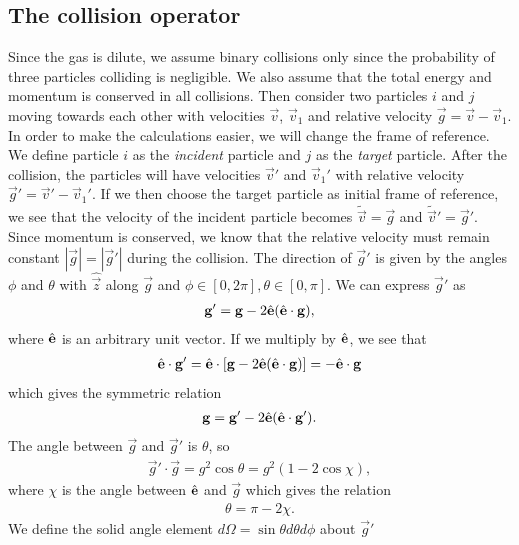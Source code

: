 \subsection{The collision operator}
Since the gas is dilute, we assume binary collisions only since the probability of three particles colliding is negligible. We also assume that the total energy and momentum is conserved in all collisions. Then consider two particles $i$ and $j$ moving towards each other with velocities $\vec v$, $\vec v_1$ and relative velocity $\vec g = \vec v - \vec v_1$. In order to make the calculations easier, we will change the frame of reference. We define particle $i$ as the \textit{incident} particle and $j$ as the \textit{target} particle. After the collision, the particles will have velocities $\vec v'$ and $\vec v_1'$ with relative velocity $\vec g' = \vec v' - \vec v_1'$. If we then choose the target particle as initial frame of reference, we see that the velocity of the incident particle becomes $\tilde {\vec v} = \vec g$ and $\tilde {\vec v}' = \vec g'$. Since momentum is conserved, we know that the relative velocity must remain constant $|\vec g| = |\vec g'|$ during the collision. The direction of $\vec g'$ is given by the angles $\phi$ and $\theta$ with $\hat {\vec z}$ along $\vec g$ and $\phi \in [0, 2\pi], \theta \in [0, \pi]$. We can express $\vec g'$ as
\begin{align}
	\mathbf g' = \mathbf g - 2\hat {\mathbf{e}}(\hat {\mathbf{e}}\cdot\mathbf g),
\end{align}
where $\hat {\mathbf{e}}$ is an arbitrary unit vector. If we multiply by $\hat {\mathbf{e}}$, we see that 
\begin{align}
	\hat {\mathbf{e}}\cdot \mathbf g' = \hat {\mathbf{e}}\cdot\left[\mathbf g - 2\hat {\mathbf{e}}(\hat {\mathbf{e}}\cdot\mathbf g)\right] = -\hat {\mathbf{e}} \cdot \mathbf g
\end{align}
which gives the symmetric relation
\begin{align}
	\mathbf g = \mathbf g' - 2\hat {\mathbf{e}}(\hat {\mathbf{e}}\cdot\mathbf g').
\end{align}
The angle between $\vec g$ and $\vec g'$ is $\theta$, so
\begin{align}
	\vec g'\cdot \vec g = g^2\cos\theta = g^2(1 - 2\cos \chi),
\end{align}
where $\chi$ is the angle between $\hat {\mathbf{e}}$ and $\vec g$ which gives the relation
\begin{align}
	\theta = \pi - 2\chi.
\end{align}
We define the solid angle element $d\Omega=\sin\theta d\theta d\phi$ about $\vec g'$ 
